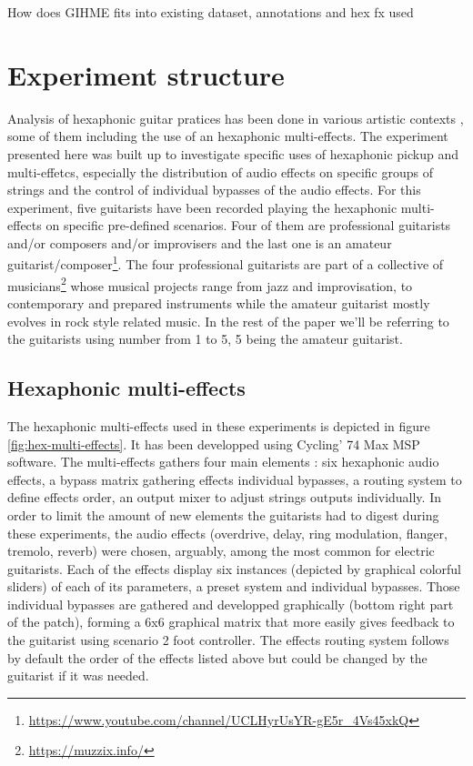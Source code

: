 \documentclass{article}
\begin{document}
How does GIHME fits into existing dataset, annotations and hex fx used
\section{Experiment structure}

Analysis of hexaphonic guitar pratices has been done in various artistic contexts \cite{Bates2009, sci:Graham2010}, some of them including the use of an hexaphonic multi-effects\cite{sci:Reboursiere2021_Phd}.
The experiment presented here was built up to investigate specific uses of hexaphonic pickup and multi-effetcs, especially the distribution of audio effects on specific groups of strings and the control of individual bypasses of the audio effects. 
For this experiment, five guitarists have been recorded playing the hexaphonic multi-effects on specific pre-defined scenarios. Four of them are professional guitarists and/or composers and/or improvisers and the last one is an amateur guitarist/composer\footnote{\href{https://www.youtube.com/channel/UCLHyrUsYR-gE5r\_4Vs45xkQ}{https://www.youtube.com/channel/UCLHyrUsYR-gE5r\_4Vs45xkQ}}. The four professional guitarists are part of a collective of musicians\footnote{\href{https://muzzix.info/}{https://muzzix.info/}} whose musical projects range from jazz and improvisation, to contemporary and prepared instruments while the amateur guitarist mostly evolves in rock style related music. In the rest of the paper we'll be referring to the guitarists using number from 1 to 5, 5 being the amateur guitarist. 

\subsection{Hexaphonic multi-effects}

The hexaphonic multi-effects used in these experiments is depicted in figure \ref{fig:hex-multi-effects}. It has been developped using Cycling' 74 Max MSP software. The multi-effects gathers four main elements : six hexaphonic audio effects, a bypass matrix gathering effects individual bypasses, a routing system to define effects order, an output mixer to adjust strings outputs individually. In order to limit the amount of new elements the guitarists had to digest during these experiments, the audio effects (overdrive, delay, ring modulation, flanger, tremolo, reverb) were chosen, arguably, among the most common for electric guitarists. Each of the effects display six instances (depicted by graphical colorful sliders) of each of its parameters, a preset system and individual bypasses. 
Those individual bypasses are gathered and developped graphically (bottom right part of the patch), forming a 6x6 graphical matrix that more easily gives feedback to the guitarist using scenario 2 foot controller. 
The effects routing system follows by default the order of the effects listed above but could be changed by the guitarist if it was needed.
\end{document}
